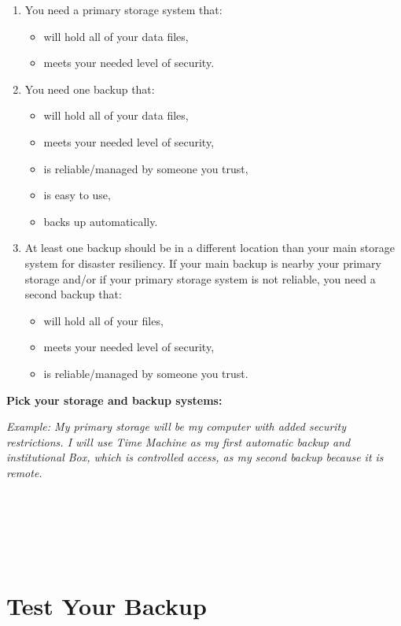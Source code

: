 \documentclass[
]{book}
\providecommand{\tightlist}{%
  \setlength{\itemsep}{0pt}\setlength{\parskip}{0pt}}
\begin{document}
\begin{enumerate}
\def\labelenumi{\arabic{enumi}.}
\tightlist
\item
  You need a primary storage system that:

  \begin{itemize}
  \tightlist
  \item
    will hold all of your data files,
  \item
    meets your needed level of security.
  \end{itemize}
\item
  You need one backup that:

  \begin{itemize}
  \tightlist
  \item
    will hold all of your data files,
  \item
    meets your needed level of security,
  \item
    is reliable/managed by someone you trust,
  \item
    is easy to use,
  \item
    backs up automatically.
  \end{itemize}
\item
  At least one backup should be in a different location than your main storage system for disaster resiliency. If your main backup is nearby your primary storage and/or if your primary storage system is not reliable, you need a second backup that:

  \begin{itemize}
  \tightlist
  \item
    will hold all of your files,
  \item
    meets your needed level of security,
  \item
    is reliable/managed by someone you trust.
  \end{itemize}
\end{enumerate}

\textbf{Pick your storage and backup systems:}

\emph{Example: My primary storage will be my computer with added security restrictions. I will use Time Machine as my first automatic backup and institutional Box, which is controlled access, as my second backup because it is remote.}

~

~

~

\newpage

\hypertarget{backup}{%
\section{Test Your Backup}\label{backup}}
\end{document}

